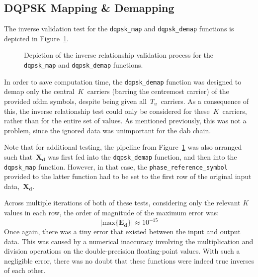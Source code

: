 \documentclass[class=report,11pt,crop=false]{standalone}
\begin{document}
\subsection{DQPSK Mapping \& Demapping}
The inverse validation test for the \texttt{dqpsk\_map} and \texttt{dqpsk\_demap} functions is depicted in Figure~\ref{fig:inverse-dqpsk-map-demap}.
\begin{figure}[htbp]
  \centering
  \captionsetup{type=figure}
  \def\svgwidth{0.95\linewidth}
  { %
      }
  \caption{Depiction of the inverse relationship validation process for the \texttt{dqpsk\_map} and \texttt{dqpsk\_demap} functions.}
  \label{fig:inverse-dqpsk-map-demap}
\end{figure}

In order to save computation time, the \texttt{dqpsk\_demap} function was designed to demap only the central~\(K\)~carriers (barring the centremost carrier) of the provided \gls{ofdm} symbols, despite being given all~\(T_u\)~carriers. As a consequence of this, the inverse relationship test could only be considered for these~\(K\)~carriers, rather than for the entire set of values. As mentioned previously, this was not a problem, since the ignored data was unimportant for the \gls{dab} chain.

Note that for additional testing, the pipeline from Figure~\ref{fig:inverse-dqpsk-map-demap} was also arranged such that~\(\mathbf{X_d}\) was first fed into the \texttt{dqpsk\_demap} function, and then into the \texttt{dqpsk\_map} function. However, in that case, the \texttt{phase\_reference\_symbol} provided to the latter function had to be set to the first row of the original input data,~\(\mathbf{X_d}\).

Across multiple iterations of both of these tests, considering only the relevant \(K\) values in each row, the order of magnitude of the maximum error was:
\begin{equation}
  \left| \mathrm{max} \{ \mathbf{E_d} \} \right| \approx 10^{-15}
\end{equation}
Once again, there was a tiny error that existed between the input and output data. This was caused by a numerical inaccuracy involving the multiplication and division operations on the double-precision floating-point values. With such a negligible error, there was no doubt that these functions were indeed true inverses of each other.
\end{document}
